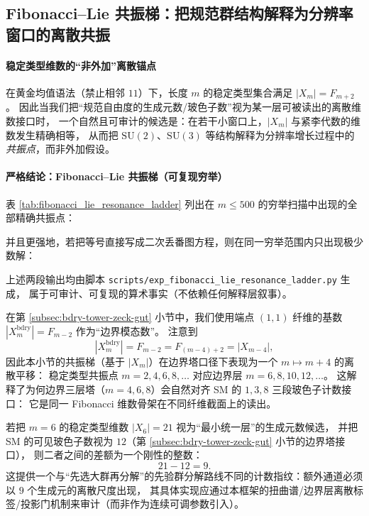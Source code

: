 \subsection{Fibonacci--Lie 共振梯：把规范群结构解释为分辨率窗口的离散共振}\label{subsec:fib-lie-resonance}

\paragraph{稳定类型维数的“非外加”离散锚点}
在黄金均值语法（禁止相邻 \(11\)）下，长度 \(m\) 的稳定类型集合满足
\(
|X_m|=F_{m+2}
\)。
因此当我们把“规范自由度的生成元数/玻色子数”视为某一层可被读出的离散维数接口时，
一个自然且可审计的候选是：在若干小窗口上，\(|X_m|\) 与紧李代数的维数发生精确相等，
从而把 \(\mathrm{SU}(2)\)、\(\mathrm{SU}(3)\) 等结构解释为分辨率增长过程中的\emph{共振点}，而非外加假设。

\paragraph{严格结论：Fibonacci--Lie 共振梯（可复现穷举）}
表 \ref{tab:fibonacci_lie_resonance_ladder} 列出在 \(m\le 500\) 的穷举扫描中出现的全部精确共振点：

并且更强地，若把等号直接写成二次丢番图方程，则在同一穷举范围内只出现极少数解：

上述两段输出均由脚本 \texttt{scripts/exp\_fibonacci\_lie\_resonance\_ladder.py} 生成，
属于可审计、可复现的算术事实（不依赖任何解释层叙事）。

\begin{remark}[与边界词塔的四步平移]\label{rem:fib-lie-resonance-shift-by-4}
在第 \ref{subsec:bdry-tower-zeck-gut} 小节中，我们使用端点 \((1,1)\) 纤维的基数
\(
|X_m^{\mathrm{bdry}}|=F_{m-2}
\)
作为“边界模态数”。
注意到
\[
|X_m^{\mathrm{bdry}}|=F_{m-2}=F_{(m-4)+2}=|X_{m-4}|,
\]
因此本小节的共振梯（基于 \(|X_m|\)）在边界塔口径下表现为一个 \(m\mapsto m+4\) 的离散平移：
稳定类型共振点 \(m=2,4,6,8,\dots\) 对应边界层 \(m=6,8,10,12,\dots\)。
这解释了为何边界三层塔（\(m=4,6,8\)）会自然对齐 SM 的 \(1,3,8\) 三段玻色子计数接口：
它是同一 Fibonacci 维数骨架在不同纤维截面上的读出。
\end{remark}

\begin{remark}[最小额外生成元计数：\(21-12=9\)]\label{rem:fib-lie-extra-9}
若把 \(m=6\) 的稳定类型维数 \( |X_6|=21 \) 视为“最小统一层”的生成元数候选，
并把 SM 的可见玻色子数视为 \(12\)（第 \ref{subsec:bdry-tower-zeck-gut} 小节的边界塔接口），
则二者之间的差额为一个刚性的整数：
\[
21-12=9.
\]
这提供一个与“先选大群再分解”的先验群分解路线不同的计数指纹：额外通道必须以 \(9\) 个生成元的离散尺度出现，
其具体实现应通过本框架的扭曲谱/边界层离散标签/投影门机制来审计（而非作为连续可调参数引入）。
\end{remark}

